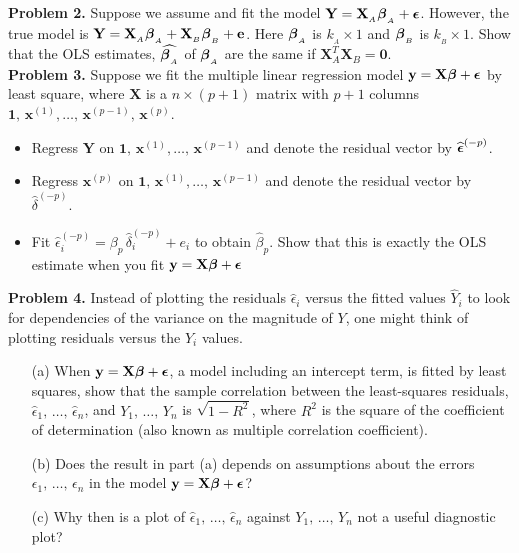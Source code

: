 \documentclass[12pt]{report}
\newcommand{\bfmath}[1]{\mbox{\boldmath$#1$\unboldmath}}
\begin{document}
\noindent
{\bf Problem 2.} Suppose we assume and fit the model $\mathbf{Y}=\mathbf{X}_{_A}\bfmath{\beta}_{_A}+\bfmath{\epsilon}$. However, the true model is 
$\mathbf{Y}=\mathbf{X}_{_A}\bfmath{\beta}_{_A}+\mathbf{X}_{_B}\bfmath{\beta}_{_B}+\mathbf{e}$.
Here $\bfmath{\beta}_{_A}$ is $k_{_A}\times 1$ and $\bfmath{\beta}_{_B}$ is $k_{_B}\times 1$. Show that the OLS estimates, $\widehat{\bfmath{\beta}_{_A}}$ of $\bfmath{\beta}_{_A}$ are the same if $\mathbf{X}_A^T\mathbf{X}_B=\mathbf{0}$. \\

\noindent
{\bf Problem 3.} Suppose we fit the multiple linear regression model $\mathbf{y}=\mathbf{X}\bfmath{\beta}+\bfmath{\epsilon}$ by least square, where $\mathbf{X}$ is a $n\times (p+1)$ matrix with $p+1$ columns $\mathbf{1},\,\mathbf{x}^{(1)},\dots,\,\mathbf{x}^{(p-1)},\, \mathbf{x}^{(p)}$. 
\begin{itemize}
\item Regress $\mathbf{Y}$ on $\mathbf{1},\,\mathbf{x}^{(1)},\dots,\, \mathbf{x}^{(p-1)}$ and denote the residual vector by $\widehat{\bfmath \epsilon}^{(-p)}$.
\item Regress $\mathbf{x}^{(p)}$ on $\mathbf{1},\,\mathbf{x}^{(1)},\dots,\, \mathbf{x}^{(p-1)}$ and denote the residual vector by $\widehat{\delta}^{(-p)}$.
\item Fit $\widehat{\epsilon}_i^{(-p)}=\beta_{p}\,\widehat{\delta}_i^{(-p)}+e_i$ to obtain $\widehat{\beta}_{p}$. Show that this is exactly the OLS estimate when you fit $\mathbf{y}=\mathbf{X}\bfmath{\beta}+\bfmath{\epsilon}$ 
\end{itemize}

\noindent
{\bf Problem 4.} Instead of plotting the residuals $\widehat{\epsilon}_i$ versus the fitted values $\widehat{Y}_i$ to look for dependencies of the variance on the magnitude of $Y$, one might think of plotting residuals versus the $Y_i$ values. 
\begin{itemize}
\item[(a)] When $\mathbf{y}=\mathbf{X}\bfmath{\beta}+\bfmath{\epsilon}$, a model including an intercept term, is fitted by least squares, show that the sample correlation between the least-squares residuals, $\widehat{\epsilon}_1,\,\dots,\,\widehat{\epsilon}_n$, and $Y_1,\,\dots,\,Y_n$ is $\sqrt{1-R^2}$, where $R^2$ is the square of the coefficient of determination (also known as multiple correlation coefficient).
\item[(b)] Does the result in part (a) depends on assumptions about the errors $\epsilon_1,\,\dots,\,\epsilon_n$ in the model $\mathbf{y}=\mathbf{X}\bfmath{\beta}+\bfmath{\epsilon}$?
\item[(c)] Why then is a plot of $\widehat{\epsilon}_1,\,\dots,\,\widehat{\epsilon}_n$ against $Y_1,\,\dots,\,Y_n$ not a useful diagnostic plot?    
\end{itemize}
\end{document}
